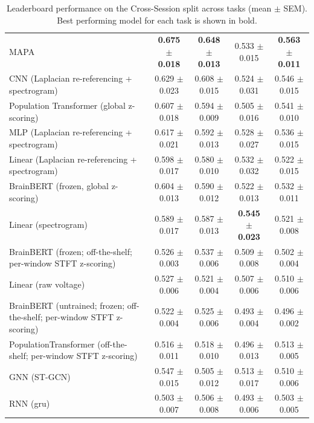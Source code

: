 \begin{table}[!htbp]
\begin{tabular}{>{\raggedright\arraybackslash}p{8cm}cccc}
\hline
MAPA & \textbf{0.675 $\pm$ 0.018} & \textbf{0.648 $\pm$ 0.013} & 0.533 $\pm$ 0.015 & \textbf{0.563 $\pm$ 0.011} \\
CNN (Laplacian re-referencing + spectrogram) & 0.629 $\pm$ 0.023 & 0.608 $\pm$ 0.015 & 0.524 $\pm$ 0.031 & 0.546 $\pm$ 0.015 \\
Population Transformer (global z-scoring) & 0.607 $\pm$ 0.018 & 0.594 $\pm$ 0.009 & 0.505 $\pm$ 0.016 & 0.541 $\pm$ 0.010 \\
MLP (Laplacian re-referencing + spectrogram) & 0.617 $\pm$ 0.021 & 0.592 $\pm$ 0.013 & 0.528 $\pm$ 0.027 & 0.536 $\pm$ 0.015 \\
Linear (Laplacian re-referencing + spectrogram) & 0.598 $\pm$ 0.017 & 0.580 $\pm$ 0.010 & 0.532 $\pm$ 0.032 & 0.522 $\pm$ 0.015 \\
BrainBERT (frozen, global z-scoring) & 0.604 $\pm$ 0.013 & 0.590 $\pm$ 0.012 & 0.522 $\pm$ 0.013 & 0.532 $\pm$ 0.011 \\
Linear (spectrogram) & 0.589 $\pm$ 0.017 & 0.587 $\pm$ 0.013 & \textbf{0.545 $\pm$ 0.023} & 0.521 $\pm$ 0.008 \\
BrainBERT (frozen; off-the-shelf; per-window STFT z-scoring) & 0.526 $\pm$ 0.003 & 0.537 $\pm$ 0.006 & 0.509 $\pm$ 0.008 & 0.502 $\pm$ 0.004 \\
Linear (raw voltage) & 0.527 $\pm$ 0.006 & 0.521 $\pm$ 0.004 & 0.507 $\pm$ 0.006 & 0.510 $\pm$ 0.006 \\
BrainBERT (untrained; frozen; off-the-shelf; per-window STFT z-scoring) & 0.522 $\pm$ 0.004 & 0.525 $\pm$ 0.006 & 0.493 $\pm$ 0.004 & 0.496 $\pm$ 0.002 \\
PopulationTransformer (off-the-shelf; per-window STFT z-scoring) & 0.516 $\pm$ 0.011 & 0.518 $\pm$ 0.010 & 0.496 $\pm$ 0.013 & 0.513 $\pm$ 0.005 \\
GNN (ST-GCN) & 0.547 $\pm$ 0.015 & 0.505 $\pm$ 0.012 & 0.513 $\pm$ 0.017 & 0.510 $\pm$ 0.006 \\
RNN (gru) & 0.503 $\pm$ 0.007 & 0.506 $\pm$ 0.008 & 0.493 $\pm$ 0.006 & 0.503 $\pm$ 0.005 \\
\hline
\end{tabular}
\caption{Leaderboard performance on the Cross-Session split across tasks (mean $\pm$ SEM). Best performing model for each task is shown in bold.}
\label{tab:leaderboard_performance_CrossSession}
\end{table}